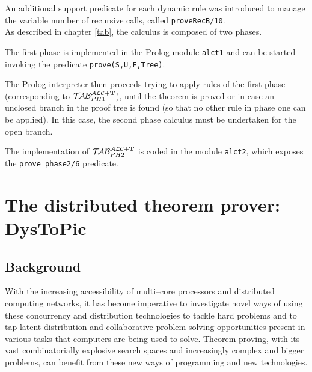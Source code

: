 \documentclass[a4paper, 11pt, oneside]{duthesis}
\newcommand{\tip}{{\bf T}}
\newcommand{\primo}{\mathrel{{\mathcal{T}\!\mathcal{AB}}}_{PH 1}^{\mathcal{ALC}+\mbox{\scriptsize $\tip$}}}
\newcommand{\secondo}{\mathrel{{\mathcal{T}\!\mathcal{AB}}}_{PH 2}^{\mathcal{ALC}+\mbox{\scriptsize $\tip$}}}
\begin{document}
\newpage

An additional support predicate for each dynamic rule was introduced to manage the variable number of recursive calls, called \texttt{proveRecB/10}.\\

As described in chapter \ref{tab}, the calculus is composed of two phases.

The first phase is implemented in the Prolog module \texttt{alct1} and can be started invoking the predicate \texttt{prove(S,U,F,Tree)}.

The Prolog interpreter then proceeds trying to apply rules of the first phase (corresponding to $\primo$), until the theorem is proved or in case an unclosed branch in the proof tree is found (so that no other rule in phase one can be applied). 
In this case, the second phase calculus must be undertaken for the open branch.

The implementation of $\secondo$ is coded in the module \texttt{alct2}, which exposes the \texttt{prove\_phase2/6} predicate.

\newpage

























\chapter{The distributed theorem prover: DysToPic}\label{chap_dystopic}
\section{Background}\label{bg}
With the increasing accessibility of multi--core processors and distributed computing networks, it has become imperative to investigate novel ways of using these concurrency and distribution technologies to tackle hard problems and to tap latent distribution and collaborative problem solving opportunities present in various tasks that computers are being used to solve.
Theorem proving, with its vast combinatorially explosive search spaces and increasingly complex and bigger problems, can benefit from these new ways of programming and new technologies\cite{conf/ieeehpcs/SripriyaBS09}.
\end{document}
